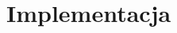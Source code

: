 \documentclass[../main.tex]{subfiles}
\begin{document}
\section{Implementacja}
    
    \newpage
    
    \newpage
          
\end{document}
